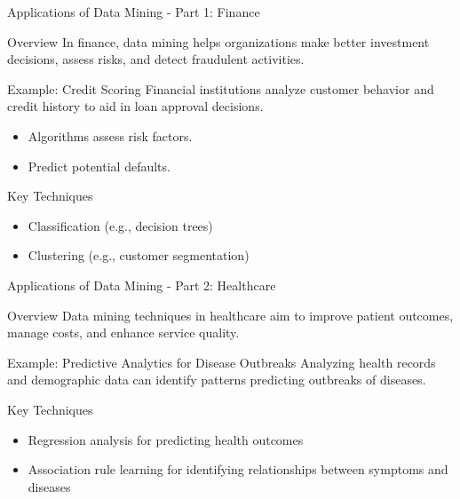 \documentclass[aspectratio=169]{beamer}
\begin{document}
\begin{frame}[fragile]{Applications of Data Mining - Part 1: Finance}
    \begin{block}{Overview}
        In finance, data mining helps organizations make better investment decisions, assess risks, and detect fraudulent activities.
    \end{block}
    \begin{block}{Example: Credit Scoring}
        Financial institutions analyze customer behavior and credit history to aid in loan approval decisions.
        \begin{itemize}
            \item Algorithms assess risk factors.
            \item Predict potential defaults.
        \end{itemize}
    \end{block}
    \begin{block}{Key Techniques}
        \begin{itemize}
            \item Classification (e.g., decision trees)
            \item Clustering (e.g., customer segmentation)
        \end{itemize}
    \end{block}
\end{frame}

\begin{frame}[fragile]{Applications of Data Mining - Part 2: Healthcare}
    \begin{block}{Overview}
        Data mining techniques in healthcare aim to improve patient outcomes, manage costs, and enhance service quality.
    \end{block}
    \begin{block}{Example: Predictive Analytics for Disease Outbreaks}
        Analyzing health records and demographic data can identify patterns predicting outbreaks of diseases.
    \end{block}
    \begin{block}{Key Techniques}
        \begin{itemize}
            \item Regression analysis for predicting health outcomes
            \item Association rule learning for identifying relationships between symptoms and diseases
        \end{itemize}
    \end{block}
\end{frame}
\end{document}
